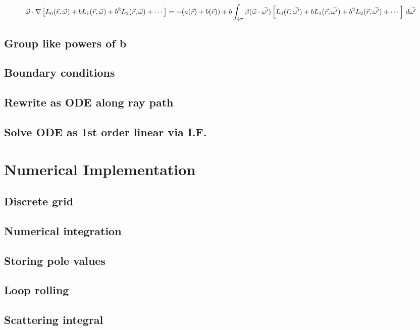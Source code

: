 \documentclass[10pt]{article}
\begin{document}
\begin{equation}
  \vec{\omega} \cdot \nabla \left[ L_0(\vec{r},\vec{\omega}) + b L_1(\vec{r},\vec{\omega}) + b^2 L_2(\vec{r},\vec{\omega}) + \cdots \right]
  = -(a(\vec{r}) + b(\vec{r})) + b\int_{4\pi}
  \beta(\vec{\omega} \cdot \vec{\omega'})
  \left[ L_0(\vec{r},\vec{\omega'}) + b L_1(\vec{r},\vec{\omega'}) + b^2 L_2(\vec{r},\vec{\omega'}) + \cdots \right] \, d\vec{\omega'}
\end{equation}
 
\subsection{Group like powers of b}
\subsection{Boundary conditions}
\subsection{Rewrite as ODE along ray path}
\subsection{Solve ODE as 1st order linear via I.F.}
  
\section{Numerical Implementation}
\subsection{Discrete grid}
\subsection{Numerical integration}
\subsection{Storing pole values}
\subsection{Loop rolling}
\subsection{Scattering integral}
  
\end{document}
